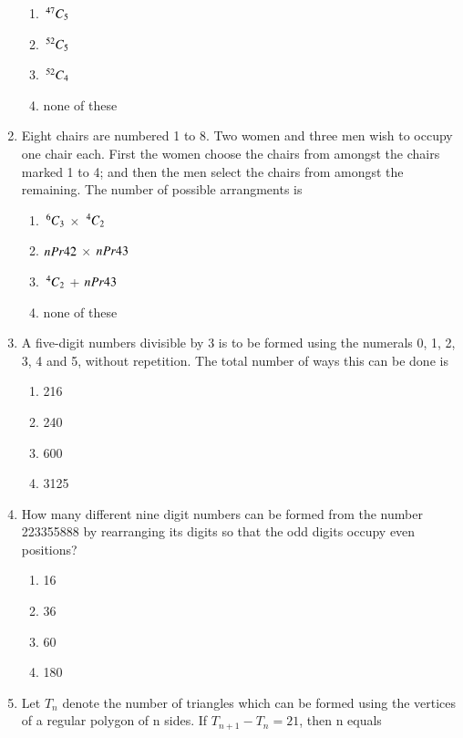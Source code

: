 \begin{enumerate}[label=\arabic*.,ref=\thesubsection.\theenumi]
\begin{enumerate}
\item $\,^{47}C_{5}$
\item $\,^{52}C_{5}$
\item $\,^{52}C_{4}$
\item none of these\\
\end{enumerate} 
\item Eight chairs are numbered 1 to 8. Two women and three men wish to occupy one chair each. First the women choose the chairs from amongst the chairs marked 1 to 4; and then the men select the chairs from amongst the remaining. The number of possible arrangments is
\begin{enumerate}
\item $\,^{6}C_{3}$ $\times$ $\,^{4}C_{2}$
\item $\\nPr{4}{2}$ $\times$ $\\nPr{4}{3}$
\item $\,^{4}C_{2}$ + $\\nPr{4}{3}$
\item none of these\\
\end{enumerate}
\item A five-digit numbers divisible by 3 is to be formed using the numerals 0, 1, 2, 3, 4 and 5, without repetition. The total number of ways this can be done is
\begin{enumerate}
\item 216
\item 240
\item 600
\item 3125\\
\end{enumerate}
\item How many different nine digit numbers can be formed from the number 223355888 by rearranging its digits so that the odd digits occupy even positions?
\begin{enumerate}
\item 16
\item 36
\item 60
\item 180\\
\end{enumerate}
\item Let $T_n$ denote the number of triangles which can be formed using the vertices of a regular polygon of n sides. If $T_{n+1}-T_n = 21$, then n equals
\begin{enumerate}

\end{enumerate}
\end{enumerate}
